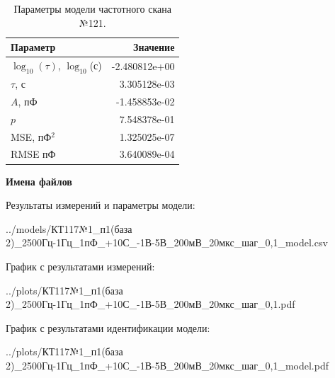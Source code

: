 \begin{table}[!ht]
    \centering
    \caption{Параметры модели частотного скана №121.}
    \begin{tabular}{|l|r|}
        \hline
        Параметр                                       & Значение                  \\ \hline
        $\log_{10}(\tau)$, $\log_{10}$(с)              & -2.480812e+00             \\ \hline
        $\tau$, с                                      & 3.305128e-03              \\ \hline
        $A$, пФ                                        & -1.458853e-02             \\ \hline
        $p$                                            & 7.548378e-01              \\ \hline
        MSE, пФ$^2$                                    & 1.325025e-07              \\ \hline
        RMSE пФ                                        & 3.640089e-04              \\ \hline
    \end{tabular}
    \label{table:frequency_scan_model_121}
\end{table}

\textbf{Имена файлов}

Результаты измерений и параметры модели:

\scriptsize../models/КТ117№1\_п1(база 2)\_2500Гц-1Гц\_1пФ\_+10С\_-1В-5В\_200мВ\_20мкс\_шаг\_0,1\_model.csv
\normalsize

График с результатами измерений:

\scriptsize../plots/КТ117№1\_п1(база 2)\_2500Гц-1Гц\_1пФ\_+10С\_-1В-5В\_200мВ\_20мкс\_шаг\_0,1.pdf
\normalsize

График с результатами идентификации модели:

\scriptsize../plots/КТ117№1\_п1(база 2)\_2500Гц-1Гц\_1пФ\_+10С\_-1В-5В\_200мВ\_20мкс\_шаг\_0,1\_model.pdf
\normalsize

